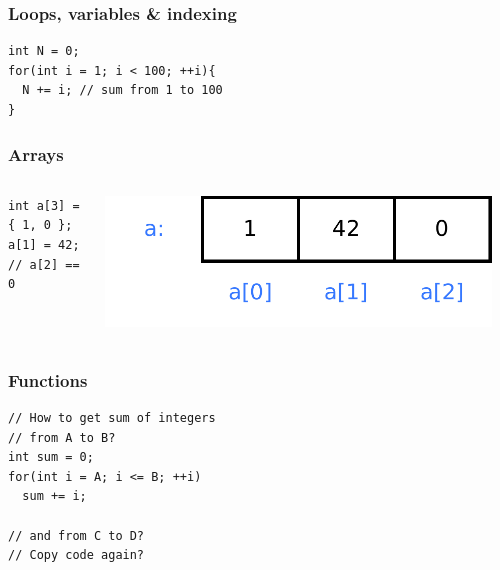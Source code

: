 \begin{frame}[fragile]
\frametitle{Loops, variables \& indexing}
\begin{lstlisting}
int N = 0;
for(int i = 1; i < 100; ++i){
  N += i; // sum from 1 to 100
}
\end{lstlisting}
\end{frame}

\begin{frame}[fragile]
\frametitle{Arrays}
\begin{columns}[c]
  \begin{column}{0.5\textwidth}
\lstset{numbers=left}
\begin{lstlisting}
int a[3] = { 1, 0 };
a[1] = 42;
// a[2] == 0
\end{lstlisting}
  \end{column}
  \begin{column}{0.5\textwidth}
    \includegraphics[width=0.95\textwidth]{figures/array0}
  \end{column}
\end{columns}
\end{frame}

\begin{frame}[fragile]
\frametitle{Functions}
\begin{lstlisting}
// How to get sum of integers
// from A to B?
int sum = 0;
for(int i = A; i <= B; ++i)
  sum += i;
  
// and from C to D?
// Copy code again?
\end{lstlisting}
\end{frame}

